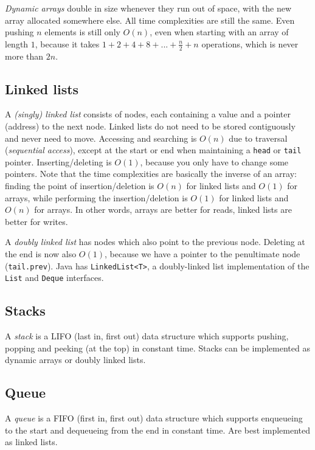 \documentclass[8pt, table, xcdraw]{article}%
\begin{document}
\emph{Dynamic arrays} double in size whenever they run out of space, with the new array allocated somewhere else. All time complexities are still the same. Even pushing $n$ elements is still only $O(n)$, even when starting with an array of length $1$, because it takes $1 + 2 + 4 + 8 + ... + \frac{n}{2} + n$ operations, which is never more than $2n$.

\subsection{Linked lists}

A \emph{(singly) linked list} consists of nodes, each containing a value and a pointer (address) to the next node. Linked lists do not need to be stored contiguously and never need to move. Accessing and searching is $O(n)$ due to traversal (\emph{sequential access}), except at the start or end when maintaining a \lstinline{head} or \lstinline{tail} pointer. Inserting/deleting is $O(1)$, because you only have to change some pointers. Note that the time complexities are basically the inverse of an array: finding the point of insertion/deletion is $O(n)$ for linked lists and $O(1)$ for arrays, while performing the insertion/deletion is $O(1)$ for linked lists and $O(n)$ for arrays. In other words, arrays are better for reads, linked lists are better for writes.

A \emph{doubly linked list} has nodes which also point to the previous node. Deleting at the end is now also $O(1)$, because we have a pointer to the penultimate node (\lstinline{tail.prev}). Java has \lstinline{LinkedList<T>}, a doubly-linked list implementation of the \lstinline{List} and \lstinline{Deque} interfaces.

\subsection{Stacks}

A \emph{stack} is a LIFO (last in, first out) data structure which supports pushing, popping and peeking (at the top) in constant time. Stacks can be implemented as dynamic arrays or doubly linked lists.

\subsection{Queue}

A \emph{queue} is a FIFO (first in, first out) data structure which supports enqueueing to the start and dequeueing from the end in constant time. Are best implemented as linked lists.
\end{document}
